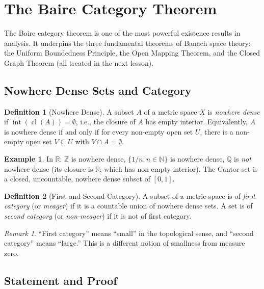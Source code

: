 \documentclass[11pt,a4paper]{article}
\theoremstyle{definition}
\newtheorem{definition}{Definition}[section]
\newtheorem{example}{Example}[section]
\theoremstyle{plain}
\theoremstyle{remark}
\newtheorem{remark}{Remark}[section]
\newcommand{\R}{\mathbb{R}}
\newcommand{\N}{\mathbb{N}}
\newcommand{\Q}{\mathbb{Q}}
\newcommand{\Z}{\mathbb{Z}}
\DeclareMathOperator{\Int}{int}
\DeclareMathOperator{\cl}{cl}
\begin{document}
\section{The Baire Category Theorem}
\label{sec:baire}

The Baire category theorem is one of the most powerful existence results in
analysis. It underpins the three fundamental theorems of Banach space theory:
the Uniform Boundedness Principle, the Open Mapping Theorem, and the Closed Graph
Theorem (all treated in the next lesson).

\subsection{Nowhere Dense Sets and Category}

\begin{definition}[Nowhere Dense]
\label{def:nowhere_dense}
A subset $A$ of a metric space $X$ is \emph{nowhere dense} if $\Int(\cl(A)) =
\emptyset$, i.e., the closure of $A$ has empty interior. Equivalently, $A$ is
nowhere dense if and only if for every non-empty open set $U$, there is a
non-empty open set $V \subseteq U$ with $V \cap A = \emptyset$.
\end{definition}

\begin{example}
In $\R$: $\Z$ is nowhere dense, $\{1/n : n \in \N\}$ is nowhere dense, $\Q$ is
\emph{not} nowhere dense (its closure is $\R$, which has non-empty interior).
The Cantor set is a closed, uncountable, nowhere dense subset of $[0,1]$.
\end{example}

\begin{definition}[First and Second Category]
\label{def:category}
A subset of a metric space is of \emph{first category} (or \emph{meager}) if it is
a countable union of nowhere dense sets. A set is of \emph{second category} (or
\emph{non-meager}) if it is not of first category.
\end{definition}

\begin{remark}
``First category'' means ``small'' in the topological sense, and ``second category''
means ``large.'' This is a different notion of smallness from measure zero.
\end{remark}

\subsection{Statement and Proof}
\end{document}
